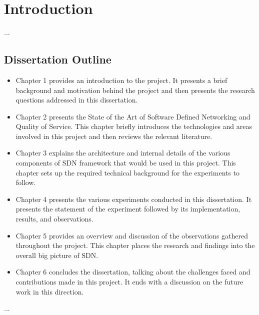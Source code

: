 
\chapter{Introduction}

...

\section{Dissertation Outline}
\begin{itemize}

\item Chapter 1 provides an introduction to the project. It presents a brief background
and motivation behind the project and then presents the research questions addressed
in this dissertation.
\item Chapter 2 presents the State of the Art of Software Defined Networking and Quality
of Service. This chapter briefly introduces the technologies and areas involved in
this project and then reviews the relevant literature.
\item Chapter 3 explains the architecture and internal details of the various components
of SDN framework that would be used in this project. This chapter sets up the
required technical background for the experiments to follow.
\item  Chapter 4 presents the various experiments conducted in this dissertation. It
presents the statement of the experiment followed by its implementation, results,
and observations.
\item Chapter 5 provides an overview and discussion of the observations gathered throughout
the project. This chapter places the research and findings into the overall big picture of SDN.
\item Chapter 6 concludes the dissertation, talking about the challenges faced and contributions
made in this project. It ends with a discussion on the future work in this direction.
\end{itemize}
	...
